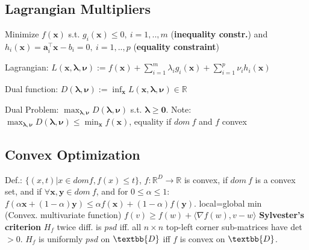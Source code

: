 
\subsection*{Lagrangian Multipliers}
Minimize  $f(\mathbf{x})$ s.t. $g_i(\mathbf{x}) \leq 0,\ i = 1, .., m$ (\textbf{inequality constr.}) and $h_i(\mathbf{x}) = \mathbf{a}_i^\top \mathbf{x} - b_i = 0,\ i = 1, .., p$ (\textbf{equality constraint})
\begin{compactdesc}
	\item[Lagrangian:] $L(\mathbf{x}, \boldsymbol{\lambda}, \boldsymbol{\nu}) := f(\mathbf{x}) + \sum_{i=1}^m \lambda_i g_i(\mathbf{x}) + \sum_{i=1}^p \nu_i h_i(\mathbf{x})$
	\item[Dual function:] $D(\boldsymbol{\lambda}, \boldsymbol{\nu}) := \inf_{\mathbf{x}} L(\mathbf{x}, \boldsymbol{\lambda}, \boldsymbol{\nu}) \in \mathbb{R}$
	\item[Dual Problem:] $\max_{\boldsymbol{\lambda}, \boldsymbol{\nu}} D(\boldsymbol{\lambda}, \boldsymbol{\nu})$ s.t. $\boldsymbol{\lambda} \geq \mathbf{0}$. Note: $\max_{\boldsymbol{\lambda}, \boldsymbol{\nu}} D(\boldsymbol{\lambda}, \boldsymbol{\nu}) \le \min_\mathbf{x}{f(\mathbf{x})}$, equality if $dom\ f$ and $f$ convex
\end{compactdesc}

\subsection*{Convex Optimization}
Def.: $\{(x,t)|x \in dom f, f(x) \leq t\}$, $f : \mathbb{R}^D \rightarrow \mathbb{R}$ is convex, if $dom\ f$ is a convex set, and if $\forall \mathbf{x}, \mathbf{y} \in dom\ f$, and for $0 \leq \alpha \leq 1$: $f(\alpha \mathbf{x} + (1 - \alpha)\mathbf{y}) \leq \alpha f(\mathbf{x}) + (1-\alpha)f(\mathbf{y})$. local=global min \\
(Convex. multivariate function) $f(v) \geq f(w) + \langle \nabla f(w), v - w \rangle$
\textbf{Sylvester's criterion} $H_f$ twice diff. is $psd$ iff. all $n\times{} n$ top-left corner sub-matrices have det $ > 0$. $H_f $ is uniformly $psd$ on $\textbb{D}$ iff $f$ is convex on $\textbb{D}$.

